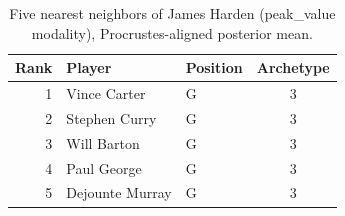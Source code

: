 \begin{table}[htbp]
  \centering\small
  \begin{tabular}{rllc}
    \toprule
    Rank & Player & Position & Archetype \\
    \midrule
    1 & Vince Carter & G & 3 \\
    2 & Stephen Curry & G & 3 \\
    3 & Will Barton & G & 3 \\
    4 & Paul George & G & 3 \\
    5 & Dejounte Murray & G & 3 \\
    \bottomrule
  \end{tabular}
  \caption{Five nearest neighbors of James Harden (peak_value modality), Procrustes-aligned posterior mean.}
  \label{tab:James_Harden_neighbors_peak_value}
\end{table}

